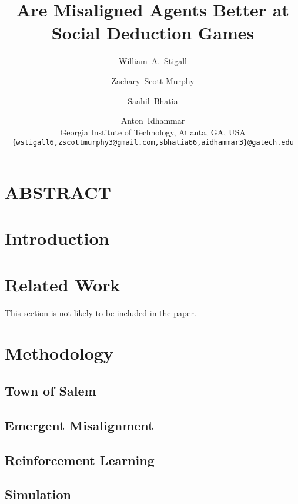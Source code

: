 \documentclass[10pt,onecolumn,letterpaper]{article}
\begin{document}
\title{Are Misaligned Agents Better at Social Deduction Games}

\author{
  William~A.~Stigall \and
  Zachary~Scott-Murphy \and
  Saahil~Bhatia \and
  Anton~Idhammar \\[0.5em]
  Georgia Institute of Technology, Atlanta, GA, USA \\[0.25em]
  {\tt\small\{wstigall6,zscottmurphy3@gmail.com,sbhatia66,aidhammar3\}@gatech.edu}
}




\maketitle


\section{ABSTRACT}
\section{Introduction}
\section{Related Work}
This section is not likely to be included in the paper. 
\section{Methodology}
\subsection{Town of Salem}
\subsection{Emergent Misalignment}
\subsection{Reinforcement Learning}
\subsection{Simulation}
\end{document}
